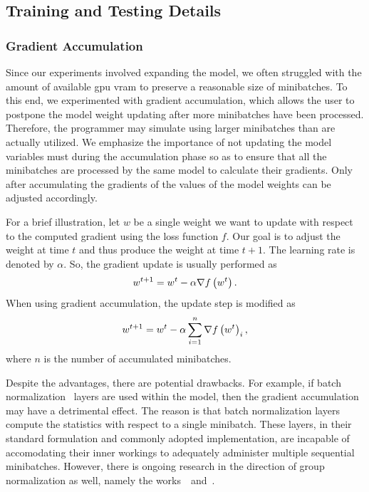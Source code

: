 \subsection{Training and Testing Details}

\subsubsection{Gradient Accumulation}

Since our experiments involved expanding the model, we often struggled with the amount of available \gls{gpu} \gls{vram} to preserve a reasonable size of minibatches. To this end, we experimented with gradient accumulation, which allows the user to postpone the model weight updating after more minibatches have been processed. Therefore, the programmer may simulate using larger minibatches than are actually utilized. We emphasize the importance of not updating the model variables must during the accumulation phase so as to ensure that all the minibatches are processed by the same model to calculate their gradients. Only after accumulating the gradients of the values of the model weights can be adjusted accordingly.

For a brief illustration, let $w$ be a single weight we want to update with respect to the computed gradient using the loss function $f$. Our goal is to adjust the weight at time $t$ and thus produce the weight at time $t + 1$. The learning rate is denoted by $\alpha$. So, the gradient update is usually performed as
\begin{equation}
    w^{t + 1} = w^t - \alpha \nabla {f} \left( w^t \right).
\end{equation}
When using gradient accumulation, the update step is modified as
\begin{equation}
    w^{t + 1} = w^t - \alpha \sum_{i = 1}^{n} \nabla {f} \left( w^t \right)_i,
\end{equation}
where $n$ is the number of accumulated minibatches.

Despite the advantages, there are potential drawbacks. For example, if batch normalization~\cite{ioffe2015batchnorm} layers are used within the model, then the gradient accumulation may have a detrimental effect. The reason is that batch normalization layers compute the statistics with respect to a single minibatch. These layers, in their standard formulation and commonly adopted implementation, are incapable of accomodating their inner workings to adequately administer multiple sequential minibatches. However, there is ongoing research in the direction of group normalization as well, namely the works~\cite{wu2018groupnorm}~and~\cite{zhou2020batchgroupnorm}.

